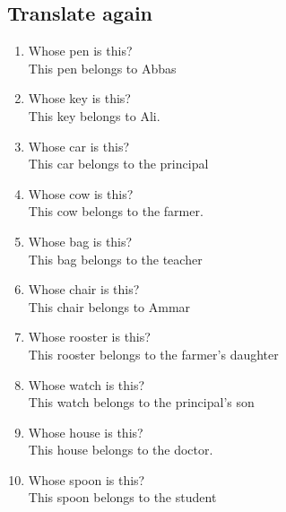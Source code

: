 \subsection{Translate again}
\begin{enumerate}
    \item Whose pen is this? \dotfill \\[0.1in]This pen belongs to Abbas \dotfill
    \item Whose key is this? \dotfill \\[0.1in]This key belongs to Ali. \dotfill
    \item Whose car is this? \dotfill \\[0.1in]This car belongs to the principal \dotfill
    \item Whose cow is this? \dotfill \\[0.1in]This cow belongs to the farmer. \dotfill
    \item Whose bag is this? \dotfill \\[0.1in]This bag belongs to the teacher \dotfill
    \item Whose chair is this? \dotfill \\[0.1in]This chair belongs to Ammar \dotfill
    \item Whose rooster is this? \dotfill \\[0.1in]This rooster belongs to the farmer's daughter \dotfill
    \item Whose watch is this? \dotfill \\[0.1in]This watch belongs to the principal's son \dotfill
    \item Whose house is this? \dotfill \\[0.1in]This house belongs to the doctor. \dotfill
    \item Whose spoon is this? \dotfill \\[0.1in]This spoon belongs to the student \dotfill
\end{enumerate}

